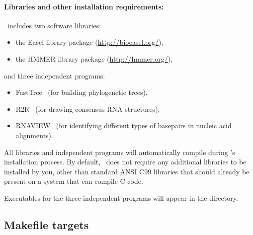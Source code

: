 \paragraph{Libraries and other installation requirements:}

\rscape\ includes two software libraries:

\begin{itemize}
\item the Easel library package (\url{http://bioeasel.org/}),
\item the HMMER library package (\url{http://hmmer.org/}),
\end{itemize}

and three independent programs:

\begin{itemize}
\item FastTree~\citep{Price10} (for building phylogenetic trees),
  
\item R2R~\citep{WeinbergBreaker11} (for drawing consensus RNA
  structures),

\item RNAVIEW~\citep{YangWesthof03} (for identifying different types of
  basepairs in nucleic acid alignments).
  
\end{itemize}

 All libraries and independent programs will automatically compile
 during \rscape's installation process.  By default, \rscape\ does not
 require any additional libraries to be installed by you, other than
 standard ANSI C99 libraries that should already be present on a
 system that can compile C code.

 Executables for the three independent programs will appear in the
  directory.

\subsection{Makefile targets}

